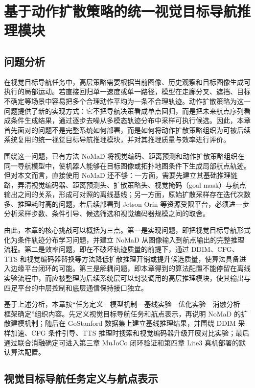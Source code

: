 ﻿%

\chapter{基于动作扩散策略的统一视觉目标导航推理模块}

\section{问题分析}

在视觉目标导航任务中，高层策略需要根据当前图像、历史观察和目标图像生成可执行的局部运动。若直接回归单一速度或单一路径，模型在走廊分叉、遮挡、目标不确定等场景中容易把多个合理动作平均为一条不合理轨迹。动作扩散策略为这一问题提供了新的实现方式：它不把导航决策看成单点回归，而是把未来航点序列看成条件生成结果，通过逐步去噪从多模态轨迹分布中采样可执行候选。因此，本章首先面对的问题不是完整系统如何部署，而是如何将动作扩散策略组织为可被后续系统复用的统一视觉目标导航推理模块，并对其推理质量与效率进行评价。

围绕这一问题，已有方法 NoMaD 将视觉编码、距离预测和动作扩散策略组织在同一导航模型中，使机器人能够在目标图像或拓扑地图条件下生成局部航点轨迹。但对本文而言，直接使用 NoMaD 还不够：一方面，需要先建立其基础推理链路，弄清视觉编码器、距离预测头、扩散策略头、视觉掩码（goal mask）与航点输出之间的关系，形成可对照的离线基线；另一方面，原始扩散采样存在迭代次数多、推理耗时高的问题，若后续部署到 Jetson Orin 等资源受限平台，必须进一步分析采样步数、条件引导、候选筛选和视觉编码器规模之间的取舍。

由此，本章的核心挑战可以概括为三点。第一是实现问题，即把视觉目标导航形式化为条件轨迹分布学习问题，并建立 NoMaD 从图像输入到航点输出的完整推理流程。第二是效率问题，即在不破坏轨迹质量的前提下，通过 DDIM、CFG、TTS 和视觉编码器替换等方法降低扩散推理开销或提升候选质量，使算法具备进入边缘平台闭环的可能。第三是解耦问题，即本章得到的算法配置不能停留在离线实验流程中，而应被整理为后续系统层可以封装调用的高层推理模块，使其输出与四足平台的中层控制和底层通信保持接口独立。

基于上述分析，本章按``任务定义—模型机制—基线实验—优化实验—消融分析—框架确定''组织内容。先定义视觉目标导航任务和航点表示，再说明 NoMaD 的扩散建模机制；随后在 GoStanford 数据集上建立基线推理结果，并围绕 DDIM 采样加速、CFG 条件引导、TTS 推理时搜索和视觉编码器升级开展对比实验；最后通过联合消融确定可进入第三章 MuJoCo 闭环验证和第四章 Lite3 真机部署的默认算法配置。

\section{视觉目标导航任务定义与航点表示}

